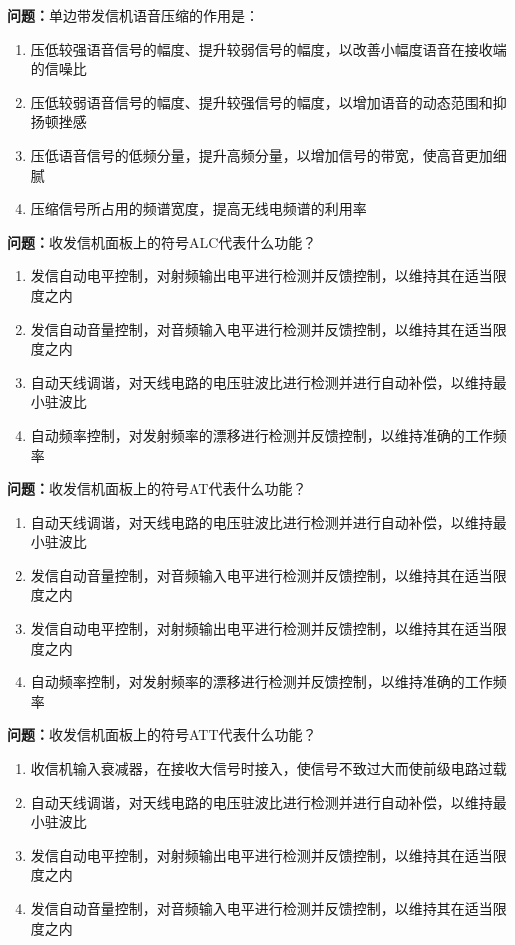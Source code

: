 \bigskip


\noindent\textbf{问题：}单边带发信机语音压缩的作用是：
\begin{enumerate}[label=\Alph*), leftmargin=3em]
\item 压低较强语音信号的幅度、提升较弱信号的幅度，以改善小幅度语音在接收端的信噪比
\item 压低较弱语音信号的幅度、提升较强信号的幅度，以增加语音的动态范围和抑扬顿挫感
\item 压低语音信号的低频分量，提升高频分量，以增加信号的带宽，使高音更加细腻
\item 压缩信号所占用的频谱宽度，提高无线电频谱的利用率
\end{enumerate}

\bigskip


\noindent\textbf{问题：}收发信机面板上的符号ALC代表什么功能？
\begin{enumerate}[label=\Alph*), leftmargin=3em]
\item 发信自动电平控制，对射频输出电平进行检测并反馈控制，以维持其在适当限度之内
\item 发信自动音量控制，对音频输入电平进行检测并反馈控制，以维持其在适当限度之内
\item 自动天线调谐，对天线电路的电压驻波比进行检测并进行自动补偿，以维持最小驻波比
\item 自动频率控制，对发射频率的漂移进行检测并反馈控制，以维持准确的工作频率
\end{enumerate}

\bigskip


\noindent\textbf{问题：}收发信机面板上的符号AT代表什么功能？
\begin{enumerate}[label=\Alph*), leftmargin=3em]
\item 自动天线调谐，对天线电路的电压驻波比进行检测并进行自动补偿，以维持最小驻波比
\item 发信自动音量控制，对音频输入电平进行检测并反馈控制，以维持其在适当限度之内
\item 发信自动电平控制，对射频输出电平进行检测并反馈控制，以维持其在适当限度之内
\item 自动频率控制，对发射频率的漂移进行检测并反馈控制，以维持准确的工作频率
\end{enumerate}

\bigskip


\noindent\textbf{问题：}收发信机面板上的符号ATT代表什么功能？
\begin{enumerate}[label=\Alph*), leftmargin=3em]
\item 收信机输入衰减器，在接收大信号时接入，使信号不致过大而使前级电路过载
\item 自动天线调谐，对天线电路的电压驻波比进行检测并进行自动补偿，以维持最小驻波比
\item 发信自动电平控制，对射频输出电平进行检测并反馈控制，以维持其在适当限度之内
\item 发信自动音量控制，对音频输入电平进行检测并反馈控制，以维持其在适当限度之内
\end{enumerate}

